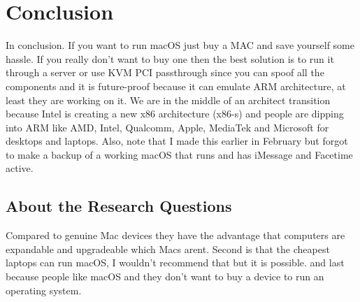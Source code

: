 \documentclass[12pt, letterpaper]{article}
\begin{document}
\section{Conclusion}
In conclusion. If you want to run macOS just buy a MAC and save yourself some hassle. If you really don't want to buy one then the best solution is to run it through a server or use KVM PCI passthrough since you can spoof all the components and it is future-proof because it can emulate ARM architecture, at least they are working on it. We are in the middle of an architect transition because Intel is creating a new x86 architecture (x86-s) and people are dipping into ARM like AMD, Intel, Qualcomm, Apple, MediaTek and Microsoft for desktops and laptops.
\hfill\break
\hfill\break
Also, note that I made this earlier in February but forgot to make a backup of a working macOS that runs and has iMessage and Facetime active.

\subsection{About the Research Questions}
Compared to genuine Mac devices they have the advantage that computers are expandable and upgradeable which Macs arent. Second is that the cheapest laptops can run macOS, I wouldn't recommend that but it is possible. and last because people like macOS and they don't want to buy a device to run an operating system.
\end{document}
